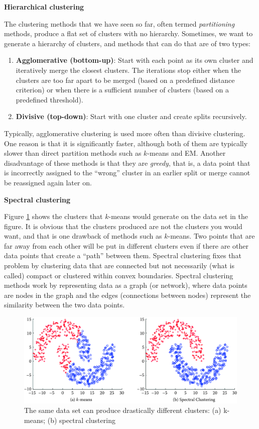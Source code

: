 \documentclass[]{krantz}
\begin{document}
\textbf{Hierarchical clustering}

\hspace*{-1pt} The clustering methods that we have seen so far, often
termed \emph{partitioning} methods, produce a flat set of clusters with
no hierarchy. Sometimes, we want to generate a hierarchy of clusters,
and methods that can do that are of two types:

\begin{enumerate}
\def\labelenumi{\arabic{enumi}.}
\item
  \textbf{Agglomerative (bottom-up)}: Start with each point as its own
  cluster and iteratively merge the closest clusters. The iterations
  stop either when the clusters are too far apart to be merged (based on
  a predefined distance criterion) or when there is a sufficient number
  of clusters (based on a predefined threshold).
\item
  \textbf{Divisive (top-down)}: Start with one cluster and create splits
  recursively.
\end{enumerate}

Typically, agglomerative clustering is used more often than divisive
clustering. One reason is that it is significantly faster, although both
of them are typically slower than direct partition methods such as
\(k\)-means and EM. Another disadvantage of these methods is that they
are \emph{greedy}, that is, a data point that is incorrectly assigned to
the ``wrong'' cluster in an earlier split or merge cannot be reassigned
again later on.

\textbf{Spectral clustering}

Figure \ref{fig:spectral} shows the clusters that \(k\)-means would
generate on the data set in the figure. It is obvious that the clusters
produced are not the clusters you would want, and that is one drawback
of methods such as \(k\)-means. Two points that are far away from each
other will be put in different clusters even if there are other data
points that create a ``path'' between them. Spectral clustering fixes
that problem by clustering data that are connected but not necessarily
(what is called) compact or clustered within convex boundaries. Spectral
clustering methods work by representing data as a graph (or network),
where data points are nodes in the graph and the edges (connections
between nodes) represent the similarity between the two data points.

\begin{figure}

{\centering \includegraphics[width=0.7\linewidth]{ChapterML/figures/spectral} 

}

\caption{The same data set can produce drastically different clusters: (a) k-means; (b) spectral clustering}\label{fig:spectral}
\end{figure}
\end{document}
